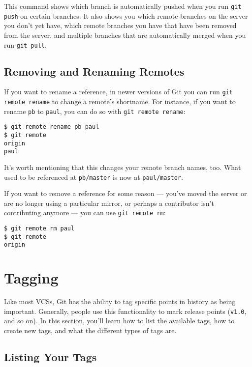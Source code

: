 \documentclass[a4paper]{book}
\begin{document}
This command shows which branch is automatically pushed when you run \texttt{git push} on certain branches. It also shows you which remote branches on the server you don't yet have, which remote branches you have that have been removed from the server, and multiple branches that are automatically merged when you run \texttt{git pull}.

\subsection{Removing and Renaming Remotes}\label{removing-and-renaming-remotes}

If you want to rename a reference, in newer versions of Git you can run \texttt{git remote rename} to change a remote's shortname. For instance, if you want to rename \texttt{pb} to \texttt{paul}, you can do so with \texttt{git remote rename}:

\begin{shaded}\begin{verbatim}
$ git remote rename pb paul
$ git remote
origin
paul
\end{verbatim}\end{shaded}

It's worth mentioning that this changes your remote branch names, too. What used to be referenced at \texttt{pb/master} is now at \texttt{paul/master}.

If you want to remove a reference for some reason --- you've moved the server or are no longer using a particular mirror, or perhaps a contributor isn't contributing anymore --- you can use \texttt{git remote rm}:

\begin{shaded}\begin{verbatim}
$ git remote rm paul
$ git remote
origin
\end{verbatim}\end{shaded}

\section{Tagging}\label{tagging}

Like most VCSs, Git has the ability to tag specific points in history as being important. Generally, people use this functionality to mark release points (\texttt{v1.0}, and so on). In this section, you'll learn how to list the available tags, how to create new tags, and what the different types of tags are.

\subsection{Listing Your Tags}\label{listing-your-tags}
\end{document}
